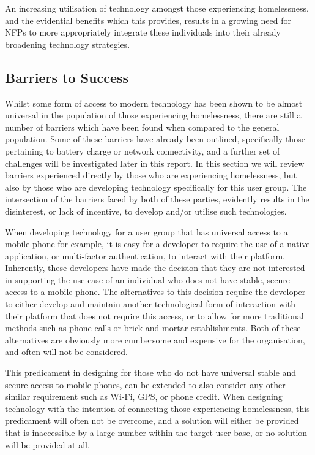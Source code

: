 An increasing utilisation of technology amongst those experiencing homelessness, and the evidential benefits which this provides, results in a growing need for NFPs to more appropriately integrate these individuals into their already broadening technology strategies.

\subsection{Barriers to Success}

Whilst some form of access to modern technology has been shown to be almost universal in the population of those experiencing homelessness, there are still a number of barriers which have been found when compared to the general population. Some of these barriers have already been outlined, specifically those pertaining to battery charge or network connectivity, and a further set of challenges will be investigated later in this report. In this section we will review barriers experienced directly by those who are experiencing homelessness, but also by those who are developing technology specifically for this user group. The intersection of the barriers faced by both of these parties, evidently results in the disinterest, or lack of incentive, to develop and/or utilise such technologies.

When developing technology for a user group that has universal access to a mobile phone for example, it is easy for a developer to require the use of a native application, or multi-factor authentication, to interact with their platform. Inherently, these developers have made the decision that they are not interested in supporting the use case of an individual who does not have stable, secure access to a mobile phone. The alternatives to this decision require the developer to either develop and maintain another technological form of interaction with their platform that does not require this access, or to allow for more traditional methods such as phone calls or brick and mortar establishments. Both of these alternatives are obviously more cumbersome and expensive for the organisation, and often will not be considered.

This predicament in designing for those who do not have universal stable and secure access to mobile phones, can be extended to also consider any other similar requirement such as Wi-Fi, GPS, or phone credit. When designing technology with the intention of connecting those experiencing homelessness, this predicament will often not be overcome, and a solution will either be provided that is inaccessible by a large number within the target user base, or no solution will be provided at all.

